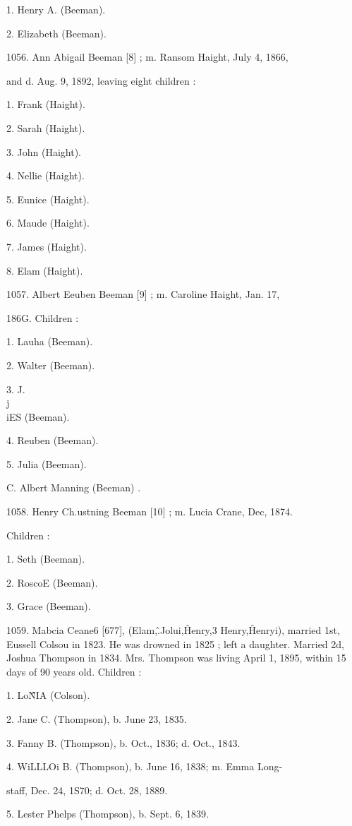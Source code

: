 1. Henry A. (Beeman). 

2. Elizabeth (Beeman). 

1056. Ann Abigail Beeman [8] ; m. Ransom Haight, July 4, 1866, 

and d. Aug. 9, 1892, leaving eight children : 

1. Frank (Haight). 

2. Sarah (Haight). 

3. John (Haight). 

4. Nellie (Haight). 

5. Eunice (Haight). 

6. Maude (Haight). 

7. James (Haight). 

8. Elam (Haight). 




1057. Albert Eeuben Beeman [9] ; m. Caroline Haight, Jan. 17, 

186G. Children : 

1. Lauha (Beeman). 

2. Walter (Beeman). 

3. J.\\j\\iES (Beeman). 

4. Reuben (Beeman). 

5. Julia (Beeman). 

C. Albert Manning (Beeman) . 

1058. Henry Ch.ustning Beeman [10] ; m. Lucia Crane, Dec, 1874. 

Children : 

1. Seth (Beeman). 

2. RoscoE (Beeman). 

3. Grace (Beeman). 

1059. Mabcia Ceane6 [677], (Elam,\^ .Jolui,\^ Henry,3 Henry,\^ 
Henryi), married 1st, Eussell Colsou in 1823. He was drowned 
in 1825 ; left a daughter. Married 2d, Joshua Thompson in 
1834. Mrs. Thompson was living April 1, 1895, within 15 days 
of 90 years old. Children : 

1. Lo\^\^NIA (Colson). 

2. Jane C. (Thompson), b. June 23, 1835. 

3. Fanny B. (Thompson), b. Oct., 1836; d. Oct., 1843. 

4. WiLLLOi B. (Thompson), b. June 16, 1838; m. Emma Long- 

staff, Dec. 24, 1S70; d. Oct. 28, 1889. 

5. Lester Phelps (Thompson), b. Sept. 6, 1839. 

